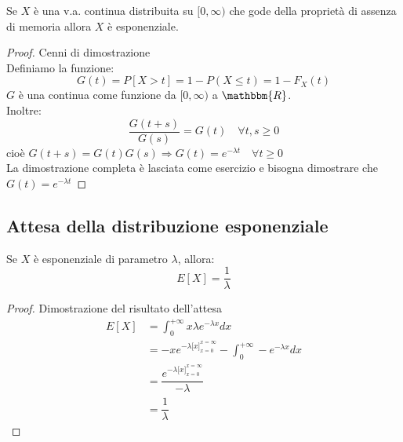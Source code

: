 \documentclass[12pt]{report}
\newcounter{theorem}
\begin{document}
  	 \begin{theorem}{}{}
  	 	Se $X$ è una v.a. continua distribuita su $[0, \infty)$ che gode della proprietà di assenza di memoria allora $X$ è esponenziale.

  	 	\begin{proof}{Cenni di dimostrazione} \quad \\
  	 		Definiamo la funzione:
  	 		\[
  	 		G(t) = P[X > t] = 1 - P(X \leq t) = 1 - F_X(t)
  	 		\]
  	 		$G$ è una continua come funzione da $[0, \infty)$ a $\mathbbm{R}$. \\
  	 		Inoltre:
  	 		\[
  	 		\dfrac{G(t + s)}{G(s)} = G(t) \quad \forall t, s \geq 0
  	 		\]
  	 		cioè $G(t + s)=G(t)G(s) \Rightarrow G(t) = e^{-\lambda t} \quad \forall t \geq 0$ \\
  	 		La dimostrazione completa è lasciata come esercizio e bisogna dimostrare che $G(t) = e^{-\lambda t}$
  	 	\end{proof}
  	 \end{theorem}
  	 \subsection{Attesa della distribuzione esponenziale}
  	 Se $X$ è esponenziale di parametro $\lambda$, allora:
  	 \[
  	 E[X] = \frac{1}{\lambda}
  	 \]
  	 \begin{proof}{Dimostrazione del risultato dell'attesa} \quad \\
  	 		\begin{align*}
  	 			E[X] &= \int_{0}^{+\infty}x\lambda e^{-\lambda x}dx \\
  	 			&= -xe^{-\lambda \big[x\big]^{x=\infty}_{x=0}} - \int_{0}^{+\infty}-e^{-\lambda x}dx \\
  	 			&= \dfrac{e^{-\lambda \big[x\big]^{x=\infty}_{x=0}}}{-\lambda} \\
  	 			&= \dfrac{1}{\lambda}
  	 		\end{align*}
  	 \end{proof}
\end{document}
